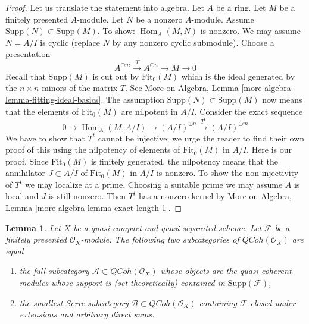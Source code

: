 \documentclass{stacks-project}
\theoremstyle{plain}
\newtheorem{lemma}[subsection]{Lemma}
\theoremstyle{definition}
\theoremstyle{remark}
\numberwithin{equation}{subsection}
\def\Hom{\mathop{\mathrm{Hom}}\nolimits}
\def\QCoh{\mathit{QCoh}}
\begin{document}
\begin{proof}
Let us translate the statement into algebra. Let $A$ be a ring. Let $M$ be a
finitely presented $A$-module. Let $N$ be a nonzero $A$-module. Assume
$\text{Supp}(N) \subset \text{Supp}(M)$. To show: $\Hom_A(M, N)$ is nonzero.
We may assume $N = A/I$ is cyclic (replace $N$ by any nonzero
cyclic submodule). Choose a presentation
$$
A^{\oplus m} \xrightarrow{T} A^{\oplus n} \to M \to 0
$$
Recall that $\text{Supp}(M)$ is cut out by $\text{Fit}_0(M)$ which
is the ideal generated by the $n \times n$ minors of the matrix $T$.
See More on Algebra, Lemma \ref{more-algebra-lemma-fitting-ideal-basics}.
The assumption $\text{Supp}(N) \subset \text{Supp}(M)$ now means that
the elements of $\text{Fit}_0(M)$ are nilpotent in $A/I$.
Consider the exact sequence
$$
0 \to \Hom_A(M, A/I) \to (A/I)^{\oplus n} \xrightarrow{T^t} (A/I)^{\oplus m}
$$
We have to show that $T^t$ cannot be injective; we urge the reader to
find their own proof of this using the nilpotency of elements of
$\text{Fit}_0(M)$ in $A/I$. Here is our proof.
Since $\text{Fit}_0(M)$ is finitely generated, the nilpotency means that
the annihilator $J \subset A/I$ of $\text{Fit}_0(M)$ in $A/I$ is nonzero.
To show the non-injectivity of $T^t$ we may localize at a prime.
Choosing a suitable prime we may assume $A$ is local and $J$ is still
nonzero. Then $T^t$ has a nonzero kernel by
More on Algebra, Lemma \ref{more-algebra-lemma-exact-length-1}.
\end{proof}

\begin{lemma}
\label{lemma-supported-on-support}
Let $X$ be a quasi-compact and quasi-separated scheme.
Let $\mathcal{F}$ be a finitely presented $\mathcal{O}_X$-module.
The following two subcategories of $\QCoh(\mathcal{O}_X)$ are equal
\begin{enumerate}
\item the full subcategory $\mathcal{A} \subset \QCoh(\mathcal{O}_X)$
whose objects are the quasi-coherent modules
whose support is (set theoretically) contained in $\text{Supp}(\mathcal{F})$,
\item the smallest Serre subcategory $\mathcal{B} \subset \QCoh(\mathcal{O}_X)$
containing
$\mathcal{F}$ closed under extensions and arbitrary direct sums.
\end{enumerate}
\end{lemma}
\end{document}
